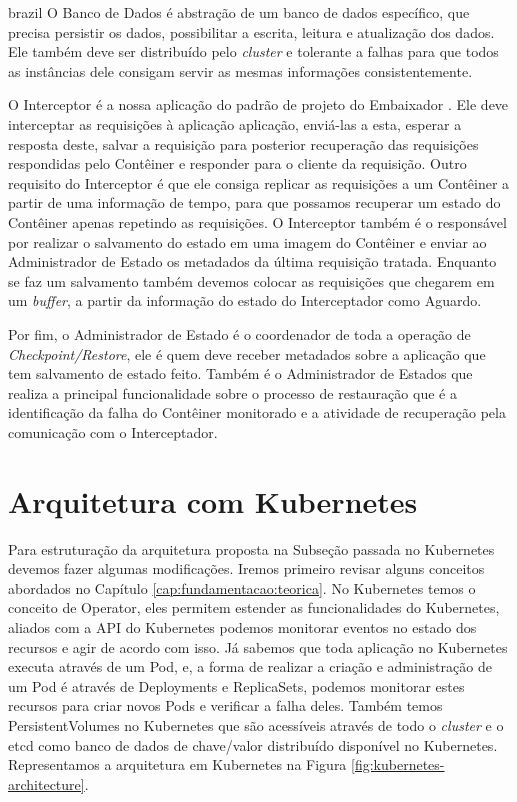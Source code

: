 \begin{otherlanguage*}{brazil}
O Banco de Dados é abstração de um banco de dados específico, que precisa
persistir os dados, possibilitar a escrita, leitura e atualização dos dados. Ele também
deve ser distribuído pelo \textit{cluster} e tolerante a falhas para que todos as instâncias
dele consigam servir as mesmas informações consistentemente.

O Interceptor é a nossa aplicação do padrão de projeto do Embaixador \cite{ambassador}. Ele
deve interceptar as requisições à aplicação aplicação, enviá-las a esta, esperar a resposta
deste, salvar a requisição para posterior recuperação das requisições respondidas pelo
Contêiner e responder para o cliente da requisição. Outro requisito do Interceptor é que ele
consiga replicar as requisições a um Contêiner a partir de uma informação de tempo, para que
possamos recuperar um estado do Contêiner apenas repetindo as requisições. O Interceptor também
é o responsável por realizar o salvamento do estado em uma imagem do Contêiner e enviar ao
Administrador de Estado os metadados da última requisição tratada. Enquanto se faz um salvamento
também devemos colocar as requisições que chegarem em um \textit{buffer}, a partir da informação
do estado do Interceptador como Aguardo.

Por fim, o Administrador de Estado é o coordenador de toda a operação de
\textit{Checkpoint/Restore}, ele é quem deve receber metadados sobre a aplicação que tem salvamento
de estado feito. Também é o Administrador de Estados que realiza a principal funcionalidade sobre
o processo de restauração que é a identificação da falha do Contêiner monitorado e a atividade de
recuperação pela comunicação com o Interceptador.

\section{Arquitetura com Kubernetes} \label{subsection:kubernetes-architecture}

Para estruturação da arquitetura proposta na Subseção passada no Kubernetes devemos
fazer algumas modificações. Iremos primeiro revisar alguns conceitos abordados no
Capítulo \ref{cap:fundamentacao:teorica}. No Kubernetes temos o conceito de Operator,
eles permitem estender as funcionalidades do Kubernetes, aliados com a API do
Kubernetes podemos monitorar eventos no estado dos recursos e agir de acordo com isso.
Já sabemos que toda aplicação no Kubernetes executa através de um Pod, e, a forma de
realizar a criação e administração de um Pod é através de Deployments e ReplicaSets,
podemos monitorar estes recursos para criar novos Pods e verificar a falha deles.
Também temos PersistentVolumes no Kubernetes que são acessíveis através de todo o
\textit{cluster} e o etcd como banco de dados de chave/valor distribuído disponível
no Kubernetes. Representamos a arquitetura em Kubernetes na Figura
\ref{fig:kubernetes-architecture}.


\end{otherlanguage*}
